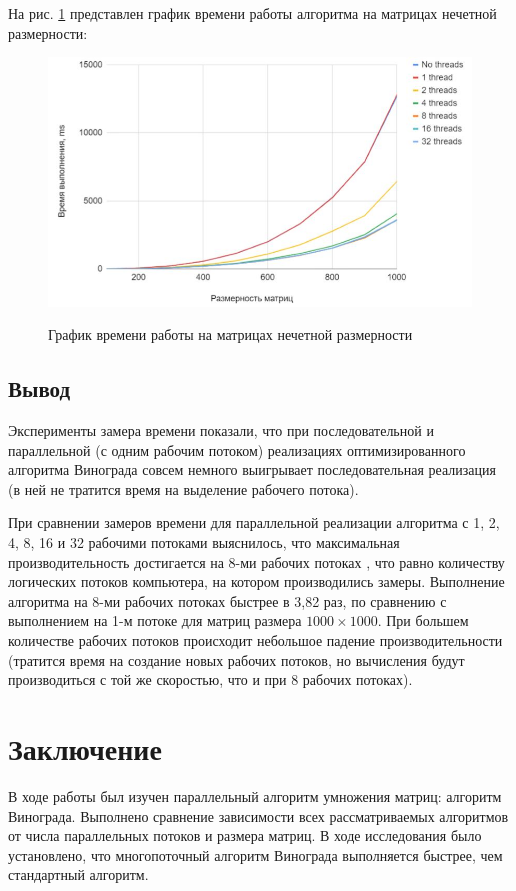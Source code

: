 \documentclass[12pt]{report}
\begin{document}
	\newpage
	На рис. \ref{nechet} представлен график времени работы алгоритма на матрицах нечетной размерности:
	
	\begin{figure}[H]
        	\begin{center}
        		{\includegraphics[scale = 0.8]{diag_nechet2}}
        		\caption{График времени работы на матрицах нечетной размерности}
        		\label{nechet}
        	\end{center}
        \end{figure}
        
 

\section{Вывод}

Эксперименты замера времени показали, что при последовательной и параллельной (с одним рабочим потоком) реализациях оптимизированного алгоритма Винограда совсем немного выигрывает последовательная реализация (в ней не тратится время на выделение рабочего потока).
       
        При сравнении замеров времени для параллельной реализации алгоритма с 1, 2, 4, 8, 16 и 32 рабочими потоками выяснилось, что максимальная производительность достигается на 8-ми рабочих потоках , что равно количеству логических потоков компьютера, на котором производились замеры. Выполнение алгоритма на 8-ми рабочих потоках быстрее в 3,82 раз, по сравнению с выполнением на 1-м потоке для матриц размера $1000 \times 1000$. При большем количестве рабочих потоков происходит небольшое падение производительности (тратится время на создание новых рабочих потоков, но вычисления будут производиться с той же скоростью, что и при 8 рабочих потоках).





\chapter*{Заключение}
В ходе работы был изучен параллельный алгоритм умножения матриц: алгоритм Винограда. Выполнено сравнение зависимости всех рассматриваемых алгоритмов от числа параллельных потоков и размера матриц. В ходе исследования было установлено, что многопоточный алгоритм Винограда выполняется быстрее, чем стандартный алгоритм.
\end{document}
